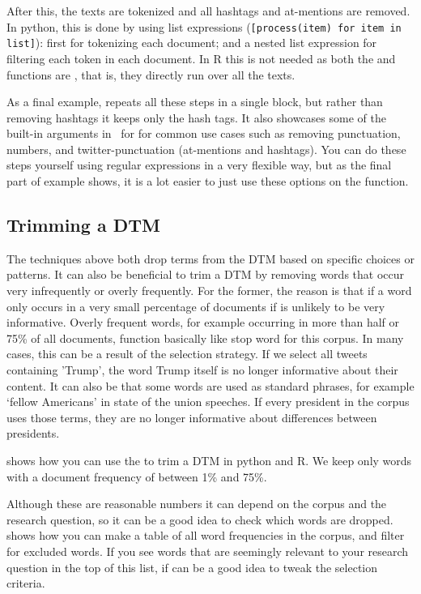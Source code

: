 After this, the texts are tokenized and all hashtags and at-mentions are removed.
In python, this is done by using list expressions (\verb#[process(item) for item in list]#): first for tokenizing each document; and a nested list expression for filtering each token in each document.
In R this is not needed as both the  and  functions are , that is, they directly run over all the texts.

As a final example,  repeats all these steps in a single block, but rather than removing hashtags it keeps only the hash tags.
It also showcases some of the built-in arguments in \quanteda\ for 
for common use cases such as removing
punctuation, numbers, and twitter-punctuation (at-mentions and hashtags).
You can do these steps yourself using regular expressions in a very flexible way, but as the final part of example 
shows, it is a lot easier to just use these options on the  function.
 

\subsection{Trimming a DTM}

The techniques above both drop terms from the DTM based on specific choices or patterns.
It can also be beneficial to trim a DTM by removing words that occur very infrequently or overly frequently.
For the former, the reason is that if a word only occurs in a very small percentage of documents if is unlikely to be very informative.
Overly frequent words, for example occurring in more than half or 75\% of all documents, function basically like stop word for this corpus.
In many cases, this can be a result of the selection strategy. If we select all tweets containing 'Trump', the word Trump itself is no longer informative about their content.
It can also be that some words are used as standard phrases, for example `fellow Americans' in state of the union speeches.
If every president in the corpus uses those terms, they are no longer informative about differences between presidents.

 shows how you can use the  to trim a DTM in python and R.
We keep only words with a document frequency of between 1\% and 75\%.

Although these are reasonable numbers it can depend on the corpus and the research question, so it can be a good idea to check which words are dropped.
 shows how you can make a table of all word frequencies in the corpus, and filter for excluded words.
If you see words that are seemingly relevant to your research question in the top of this list,
if can be a good idea to tweak the selection criteria. 

